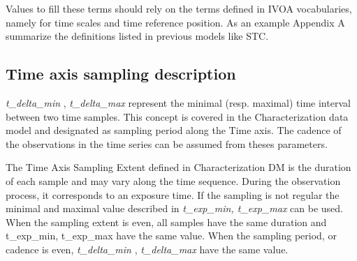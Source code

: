 \documentclass[11pt,a4paper]{ivoa}
\begin{document}
 
Values to fill these terms should rely on the terms defined in IVOA vocabularies, namely for  time scales and time reference position. 
As an example Appendix A summarize the definitions listed in previous models like STC.
 
\subsection{Time axis sampling description}
\emph{t\_delta\_min }, \emph{t\_delta\_max}  represent the minimal (resp. maximal) time interval between two time samples.
This concept is covered in the Characterization data model \citep{2008ivoa.spec.0325L} and designated as sampling period along the Time axis. 
The cadence of the observations in the time series  can be assumed from theses parameters. 
 
 The Time Axis Sampling Extent defined in Characterization DM is the duration of each sample and may vary along the time sequence. 
 During the observation process, it corresponds to an exposure time. 
 If the sampling is not regular the minimal and maximal value described in \emph{ t\_exp\_min, t\_exp\_max} can be used. 
When the sampling extent  is even, all samples have the same duration and  t\_exp\_min, t\_exp\_max have the same value. 
When the sampling period, or cadence  is even, \emph{t\_delta\_min }, \emph{t\_delta\_max} have the same value. 
\end{document}

